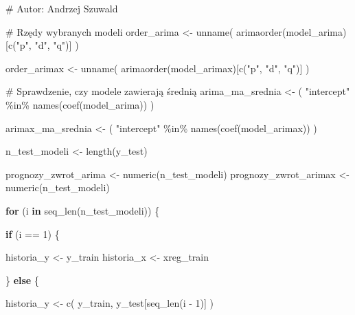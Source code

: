 \documentclass[
  polish,
  letterpaper,
  DIV=11,
  numbers=noendperiod]{scrartcl}
\newenvironment{Shaded}{\begin{snugshade}}{\end{snugshade}}
\newcommand{\CommentTok}[1]{\textcolor[rgb]{0.37,0.37,0.37}{#1}}
\newcommand{\ControlFlowTok}[1]{\textcolor[rgb]{0.00,0.23,0.31}{\textbf{#1}}}
\newcommand{\DecValTok}[1]{\textcolor[rgb]{0.68,0.00,0.00}{#1}}
\newcommand{\FunctionTok}[1]{\textcolor[rgb]{0.28,0.35,0.67}{#1}}
\newcommand{\NormalTok}[1]{\textcolor[rgb]{0.00,0.23,0.31}{#1}}
\newcommand{\OtherTok}[1]{\textcolor[rgb]{0.00,0.23,0.31}{#1}}
\newcommand{\SpecialCharTok}[1]{\textcolor[rgb]{0.37,0.37,0.37}{#1}}
\newcommand{\StringTok}[1]{\textcolor[rgb]{0.13,0.47,0.30}{#1}}
\begin{document}
\begin{Shaded}
\begin{Highlighting}[]
\CommentTok{\# Autor: Andrzej Szuwald}

\CommentTok{\# Rzędy wybranych modeli}
\NormalTok{order\_arima }\OtherTok{\textless{}{-}} \FunctionTok{unname}\NormalTok{(}
  \FunctionTok{arimaorder}\NormalTok{(model\_arima)[}\FunctionTok{c}\NormalTok{(}\StringTok{"p"}\NormalTok{, }\StringTok{"d"}\NormalTok{, }\StringTok{"q"}\NormalTok{)]}
\NormalTok{)}

\NormalTok{order\_arimax }\OtherTok{\textless{}{-}} \FunctionTok{unname}\NormalTok{(}
  \FunctionTok{arimaorder}\NormalTok{(model\_arimax)[}\FunctionTok{c}\NormalTok{(}\StringTok{"p"}\NormalTok{, }\StringTok{"d"}\NormalTok{, }\StringTok{"q"}\NormalTok{)]}
\NormalTok{)}

\CommentTok{\# Sprawdzenie, czy modele zawierają średnią}
\NormalTok{arima\_ma\_srednia }\OtherTok{\textless{}{-}}\NormalTok{ (}
  \StringTok{"intercept"} \SpecialCharTok{\%in\%} \FunctionTok{names}\NormalTok{(}\FunctionTok{coef}\NormalTok{(model\_arima))}
\NormalTok{)}

\NormalTok{arimax\_ma\_srednia }\OtherTok{\textless{}{-}}\NormalTok{ (}
  \StringTok{"intercept"} \SpecialCharTok{\%in\%} \FunctionTok{names}\NormalTok{(}\FunctionTok{coef}\NormalTok{(model\_arimax))}
\NormalTok{)}

\NormalTok{n\_test\_modeli }\OtherTok{\textless{}{-}} \FunctionTok{length}\NormalTok{(y\_test)}

\NormalTok{prognozy\_zwrot\_arima }\OtherTok{\textless{}{-}} \FunctionTok{numeric}\NormalTok{(n\_test\_modeli)}
\NormalTok{prognozy\_zwrot\_arimax }\OtherTok{\textless{}{-}} \FunctionTok{numeric}\NormalTok{(n\_test\_modeli)}

\ControlFlowTok{for}\NormalTok{ (i }\ControlFlowTok{in} \FunctionTok{seq\_len}\NormalTok{(n\_test\_modeli)) \{}

  \ControlFlowTok{if}\NormalTok{ (i }\SpecialCharTok{==} \DecValTok{1}\NormalTok{) \{}

\NormalTok{    historia\_y }\OtherTok{\textless{}{-}}\NormalTok{ y\_train}
\NormalTok{    historia\_x }\OtherTok{\textless{}{-}}\NormalTok{ xreg\_train}

\NormalTok{  \} }\ControlFlowTok{else}\NormalTok{ \{}

\NormalTok{    historia\_y }\OtherTok{\textless{}{-}} \FunctionTok{c}\NormalTok{(}
\NormalTok{      y\_train,}
\NormalTok{      y\_test[}\FunctionTok{seq\_len}\NormalTok{(i }\SpecialCharTok{{-}} \DecValTok{1}\NormalTok{)]}
\NormalTok{    )}


\end{Highlighting}
\end{Shaded}
\end{document}
